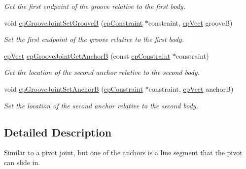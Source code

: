 \begin{DoxyCompactItemize}
\begin{DoxyCompactList}\small\item\em Get the first endpoint of the groove relative to the first body. \end{DoxyCompactList}\item 
\hypertarget{group__cp_groove_joint_ga3279be01f1e153cec1fe5172846d8994}{}void \hyperlink{group__cp_groove_joint_ga3279be01f1e153cec1fe5172846d8994}{cp\+Groove\+Joint\+Set\+Groove\+B} (\hyperlink{structcp_constraint}{cp\+Constraint} $\ast$constraint, \hyperlink{structcp_vect}{cp\+Vect} groove\+B)\label{group__cp_groove_joint_ga3279be01f1e153cec1fe5172846d8994}

\begin{DoxyCompactList}\small\item\em Set the first endpoint of the groove relative to the first body. \end{DoxyCompactList}\item 
\hypertarget{group__cp_groove_joint_ga757e927ead4d7a46a176a9506bd00cec}{}\hyperlink{structcp_vect}{cp\+Vect} \hyperlink{group__cp_groove_joint_ga757e927ead4d7a46a176a9506bd00cec}{cp\+Groove\+Joint\+Get\+Anchor\+B} (const \hyperlink{structcp_constraint}{cp\+Constraint} $\ast$constraint)\label{group__cp_groove_joint_ga757e927ead4d7a46a176a9506bd00cec}

\begin{DoxyCompactList}\small\item\em Get the location of the second anchor relative to the second body. \end{DoxyCompactList}\item 
\hypertarget{group__cp_groove_joint_ga4eb105a8c2a48d6348369041c8ec0b97}{}void \hyperlink{group__cp_groove_joint_ga4eb105a8c2a48d6348369041c8ec0b97}{cp\+Groove\+Joint\+Set\+Anchor\+B} (\hyperlink{structcp_constraint}{cp\+Constraint} $\ast$constraint, \hyperlink{structcp_vect}{cp\+Vect} anchor\+B)\label{group__cp_groove_joint_ga4eb105a8c2a48d6348369041c8ec0b97}

\begin{DoxyCompactList}\small\item\em Set the location of the second anchor relative to the second body. \end{DoxyCompactList}\end{DoxyCompactItemize}


\subsection{Detailed Description}
Similar to a pivot joint, but one of the anchors is a line segment that the pivot can slide in. 

